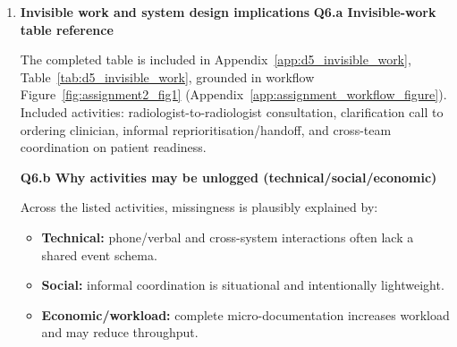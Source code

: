 \begin{enumerate}
\textbf{Q5.f Most challenging facet and reason}\par
The \textbf{Human} facet was most difficult. Event logs capture actions but rarely intent, negotiation, and informal coordination. The \textbf{Source} facet was also difficult because provenance questions often require context outside the event table.

\textbf{Q5.g Alternative assessment options}
\begin{itemize}
  \item Add explicit provenance metadata (production/test flag, entry mode, user context).
  \item Strengthen interoperability at capture time with a consistent event profile (stable case identifiers, structured reason codes, and aligned FHIR resource/event mappings such as \texttt{ServiceRequest}, \texttt{ImagingStudy}, \texttt{DiagnosticReport}) to reduce cross-system ambiguity .
  \item Triangulate with linked systems (RIS/PACS/message logs) for cross-source validation.
  \item Use targeted mini-interviews or debriefs for anomalous cases.
  \item Run periodic audits on documentation practice and timing behavior.
\end{itemize}

\item \textbf{Invisible work and system design implications}
\textbf{Q6.a Invisible-work table reference}\par
The completed table is included in Appendix~\ref{app:d5_invisible_work}, Table~\ref{tab:d5_invisible_work}, grounded in workflow Figure~\ref{fig:assignment2_fig1} (Appendix~\ref{app:assignment_workflow_figure}). Included activities: radiologist-to-radiologist consultation, clarification call to ordering clinician, informal reprioritisation/handoff, and cross-team coordination on patient readiness.

\textbf{Q6.b Why activities may be unlogged (technical/social/economic)}\par
Across the listed activities, missingness is plausibly explained by:
\begin{itemize}
  \item \textbf{Technical:} phone/verbal and cross-system interactions often lack a shared event schema.
  \item \textbf{Social:} informal coordination is situational and intentionally lightweight.
  \item \textbf{Economic/workload:} complete micro-documentation increases workload and may reduce throughput.
\end{itemize}


\end{enumerate}
